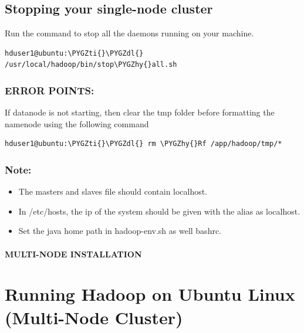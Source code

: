 \documentclass[a4paper,12pt,oneside]{sphinxmanual}
\def\PYGZdl{\char`\$}
\def\PYGZhy{\char`\-}
\def\PYGZti{\char`\~}
\begin{document}
\subsection{Stopping your single-node cluster}
\label{document:stopping-your-single-node-cluster}
Run the command to stop all the daemons running on your machine.

\begin{Verbatim}[commandchars=\\\{\}]
hduser1@ubuntu:\PYGZti{}\PYGZdl{} /usr/local/hadoop/bin/stop\PYGZhy{}all.sh
\end{Verbatim}


\subsubsection{ERROR POINTS:}
\label{document:error-points}
If datanode is not starting, then clear the tmp folder before formatting the namenode using the following command

\begin{Verbatim}[commandchars=\\\{\}]
hduser1@ubuntu:\PYGZti{}\PYGZdl{} rm \PYGZhy{}Rf /app/hadoop/tmp/*
\end{Verbatim}


\subsubsection{Note:}
\label{document:id4}\begin{itemize}
\item {} 
The masters and slaves file should contain localhost.

\item {} 
In /etc/hosts, the ip of the system should be given with the alias as localhost.

\item {} 
Set the java home path in hadoop-env.sh as well bashrc.

\end{itemize}


\paragraph{MULTI-NODE INSTALLATION}
\label{document:multi-node-installation}

\section{Running Hadoop on Ubuntu Linux (Multi-Node Cluster)}
\label{document:running-hadoop-on-ubuntu-linux-multi-node-cluster}
\end{document}
